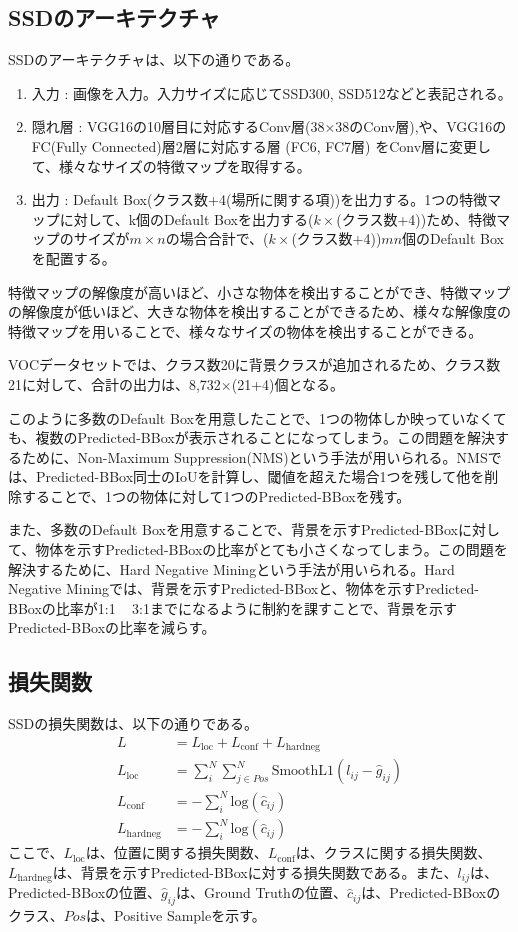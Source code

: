 \documentclass{ltjsarticle}
\begin{document}
\subsection{SSDのアーキテクチャ}
SSDのアーキテクチャは、以下の通りである。
\begin{enumerate}
  \item 入力 : 画像を入力。入力サイズに応じてSSD300, SSD512などと表記される。
  \item 隠れ層 : VGG16の10層目に対応するConv層(38$\times$38のConv層),や、VGG16のFC(Fully Connected)層2層に対応する層 (FC6, FC7層) をConv層に変更して、様々なサイズの特徴マップを取得する。
  \item 出力 : Default Box(クラス数+4(場所に関する項))を出力する。1つの特徴マップに対して、k個のDefault Boxを出力する($k\times$(クラス数+4))ため、特徴マップのサイズが$m\times n$の場合合計で、($k\times$(クラス数+4))$mn$個のDefault Boxを配置する。
\end{enumerate}
特徴マップの解像度が高いほど、小さな物体を検出することができ、特徴マップの解像度が低いほど、大きな物体を検出することができるため、様々な解像度の特徴マップを用いることで、様々なサイズの物体を検出することができる。
\par
VOCデータセットでは、クラス数20に背景クラスが追加されるため、クラス数21に対して、合計の出力は、8,732$\times$(21+4)個となる。
\par
このように多数のDefault Boxを用意したことで、1つの物体しか映っていなくても、複数のPredicted-BBoxが表示されることになってしまう。この問題を解決するために、Non-Maximum Suppression(NMS)という手法が用いられる。NMSでは、Predicted-BBox同士のIoUを計算し、閾値を超えた場合1つを残して他を削除することで、1つの物体に対して1つのPredicted-BBoxを残す。
\par
また、多数のDefault Boxを用意することで、背景を示すPredicted-BBoxに対して、物体を示すPredicted-BBoxの比率がとても小さくなってしまう。この問題を解決するために、Hard Negative Miningという手法が用いられる。Hard Negative Miningでは、背景を示すPredicted-BBoxと、物体を示すPredicted-BBoxの比率が1:1 ~ 3:1までになるように制約を課すことで、背景を示すPredicted-BBoxの比率を減らす。

\subsection{損失関数}
SSDの損失関数は、以下の通りである。
\begin{align}
  L &= L_{\text{loc}} + L_{\text{conf}} + L_{\text{hardneg}}\\
  L_{\text{loc}} &= \sum_{i}^{N} \sum_{j\in Pos}^{N} \text{SmoothL1}(l_{ij} - \hat{g}_{ij})\\
  L_{\text{conf}} &= -\sum_{i}^{N} \text{log}(\hat{c}_{ij})\\
  L_{\text{hardneg}} &= -\sum_{i}^{N} \text{log}(\hat{c}_{ij})
\end{align}
ここで、$L_{\text{loc}}$は、位置に関する損失関数、$L_{\text{conf}}$は、クラスに関する損失関数、$L_{\text{hardneg}}$は、背景を示すPredicted-BBoxに対する損失関数である。また、$l_{ij}$は、Predicted-BBoxの位置、$\hat{g}_{ij}$は、Ground Truthの位置、$\hat{c}_{ij}$は、Predicted-BBoxのクラス、$Pos$は、Positive Sampleを示す。
\end{document}
